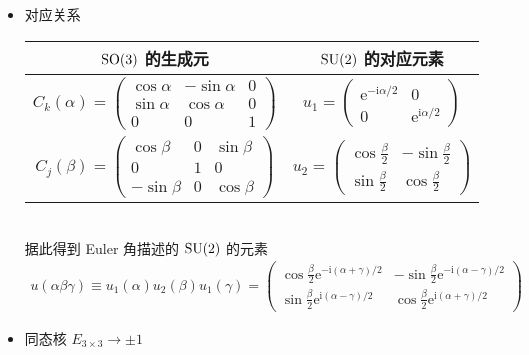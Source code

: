 \documentclass[12pt,a4paper]{article}%
\numberwithin{equation}{section}%
\newcommand\mi{\mathrm{i}}
\newcommand\e{\mathrm{e}}%
\begin{document}
\begin{enumerate}
\begin{itemize}
\begin{itemize}
			\item 对应关系\\
				\begin{tabular}{cc}
				$\mathrm{SO}(3)$ 的生成元 & $\mathrm{SU}(2)$ 的对应元素 \\\hline
				$C_k(\alpha) = \begin{pmatrix}
					\cos\alpha & -\sin\alpha & 0\\
					\sin\alpha & \cos\alpha & 0 \\
					0 & 0 & 1
				\end{pmatrix}$ & $u_1 = \begin{pmatrix}
					\e^{-\mi\alpha/2} & 0 \\
					0 & \e^{\mi\alpha/2}
				\end{pmatrix}$ \\
				$C_j(\beta) = \begin{pmatrix}
					\cos\beta & 0 & \sin\beta \\
					0 & 1 & 0 \\
					-\sin\beta & 0 & \cos\beta
				\end{pmatrix}$ & $u_2 = \begin{pmatrix}
					\cos\frac\beta 2 & -\sin\frac\beta 2 \\
					\sin\frac\beta 2 & \cos\frac\beta 2
				\end{pmatrix}$\\\hline
				\end{tabular}\\
				据此得到 Euler 角描述的 $\mathrm{SU}(2)$ 的元素
				\begin{align}\label{equ:euler_ck}
					u(\alpha\beta\gamma) \equiv u_1(\alpha)u_2(\beta)u_1(\gamma) = 
					\begin{pmatrix}
						\cos\frac\beta 2\e^{-\mi(\alpha+\gamma)/2} & 
						-\sin\frac\beta 2\e^{-\mi(\alpha-\gamma)/2} \\
						\sin\frac\beta 2\e^{\mi(\alpha-\gamma)/2} & 
						\cos\frac\beta 2\e^{\mi(\alpha + \gamma)/2}
					\end{pmatrix}
				\end{align}
			\item 同态核 $E_{3\times 3}\rightarrow \pm 1$ 
		\end{itemize}
	\end{itemize}
\end{enumerate}
\end{document}
